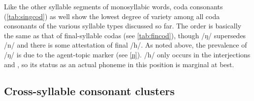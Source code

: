 Like the other syllable segments of monosyllabic words, coda consonants
(\autoref{tab:singcod}) as well show the lowest degree of variety among all
coda consonants of the various syllable types discussed so far. The order is
basically the same as that of final-syllable codas (see \autoref{tab:fincod}),
though /ŋ/ supersedes /n/ and there is some attestation of final /h/. As noted
above, the prevalence of /ŋ/ is due to the agent-topic marker 
(see \autoref{ŋ}). /h/ only occurs in the interjections  and
, so its status as an actual phoneme in this position is 
marginal at best.%

\subsection{Cross-syllable consonant clusters}
%

